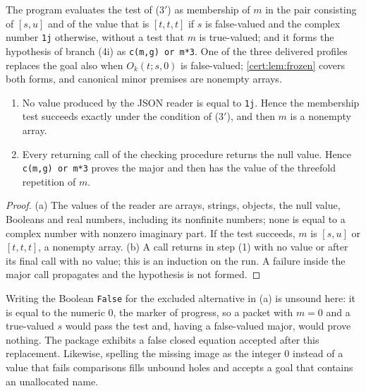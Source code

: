 The program evaluates the test of ($3'$) as membership of $m$ in the pair
consisting of $[s,u]$ and of the value that is $[t,t,t]$ if $s$ is
false-valued and the complex number \texttt{1j} otherwise, without a test
that $m$ is true-valued; and it forms the hypothesis of branch (4i) as
\texttt{c(m,g) or m*3}. One of the three delivered profiles replaces the goal
also when $O_k(t;s,0)$ is false-valued; \cref{cert:lem:frozen} covers both
forms, and canonical minor premises are nonempty arrays.

\begin{lemma}\label{cert:lem:preval-text}
\begin{enumerate}[label=(\alph*)]
\item No value produced by the JSON reader is equal to \texttt{1j}. Hence the
membership test succeeds exactly under the condition of ($3'$), and then $m$
is a nonempty array.
\item Every returning call of the checking procedure returns the null value.
Hence \texttt{c(m,g) or m*3} proves the major and then has the value of the
threefold repetition of $m$.
\end{enumerate}
\end{lemma}
\begin{proof}
(a) The values of the reader are arrays, strings, objects, the null value,
Booleans and real numbers, including its nonfinite numbers; none is equal to
a complex number with nonzero imaginary part. If the test succeeds, $m$ is
$[s,u]$ or $[t,t,t]$, a nonempty array. (b) A call returns in step (1) with
no value or after its final call with no value; this is an induction on the
run. A failure inside the major call propagates and the hypothesis is not
formed.
\end{proof}

Writing the Boolean \texttt{False} for the excluded alternative in (a) is
unsound here: it is equal to the numeric $0$, the marker of progress, so a
packet with $m=0$ and a true-valued $s$ would pass the test and, having a
false-valued major, would prove nothing. The package exhibits a false closed
equation accepted after this replacement. Likewise, spelling the missing
image as the integer $0$ instead of a value that fails comparisons fills
unbound holes and accepts a goal that contains an unallocated name.

